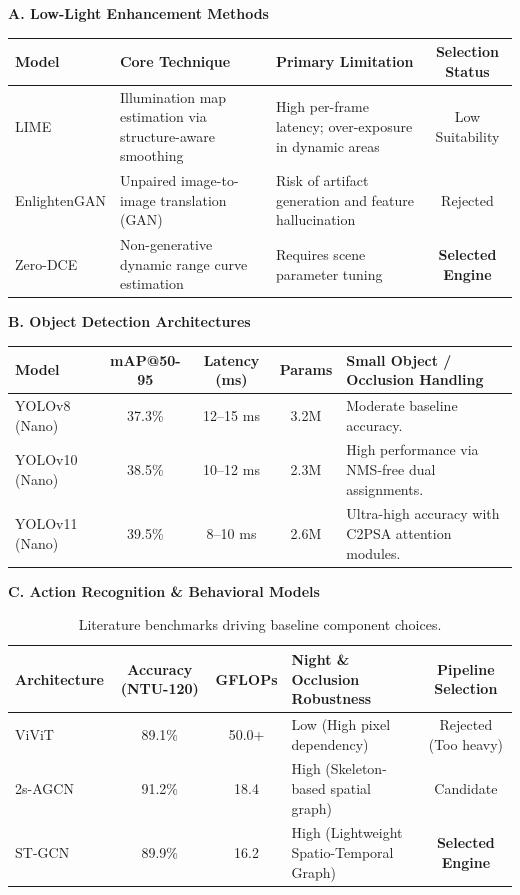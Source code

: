 \documentclass[11pt, a4paper]{article}
\begin{document}
\textbf{A. Low-Light Enhancement Methods}
\begin{table}[H]
\centering
\scriptsize
\renewcommand{\arraystretch}{1.2}
\begin{tabularx}{\textwidth}{|l|X|X|c|}
\hline
\textbf{Model} & \textbf{Core Technique} & \textbf{Primary Limitation} & \textbf{Selection Status} \\
\hline
LIME & Illumination map estimation via structure-aware smoothing & High per-frame latency; over-exposure in dynamic areas & Low Suitability \\
\hline
EnlightenGAN & Unpaired image-to-image translation (GAN) & Risk of artifact generation and feature hallucination & Rejected \\
\hline
Zero-DCE & Non-generative dynamic range curve estimation & Requires scene parameter tuning & \textbf{Selected Engine} \\
\hline
\end{tabularx}
\end{table}

\textbf{B. Object Detection Architectures}
\begin{table}[H]
\centering
\scriptsize
\renewcommand{\arraystretch}{1.2}
\begin{tabularx}{\textwidth}{|l|c|c|c|X|}
\hline
\textbf{Model} & \textbf{mAP@50-95} & \textbf{Latency (ms)} & \textbf{Params} & \textbf{Small Object / Occlusion Handling} \\
\hline
YOLOv8 (Nano) & 37.3\% & 12--15 ms & 3.2M & Moderate baseline accuracy. \\
\hline
YOLOv10 (Nano) & 38.5\% & 10--12 ms & 2.3M & High performance via NMS-free dual assignments. \\
\hline
YOLOv11 (Nano) & 39.5\% & 8--10 ms & 2.6M & Ultra-high accuracy with C2PSA attention modules. \\
\hline
\end{tabularx}
\end{table}

\textbf{C. Action Recognition \& Behavioral Models}
\begin{table}[H]
\centering
\scriptsize
\renewcommand{\arraystretch}{1.2}
\begin{tabularx}{\textwidth}{|X|c|c|X|c|}
\hline
\textbf{Architecture} & \textbf{Accuracy (NTU-120)} & \textbf{GFLOPs} & \textbf{Night \& Occlusion Robustness} & \textbf{Pipeline Selection} \\
\hline
ViViT & 89.1\% & 50.0+ & Low (High pixel dependency) & Rejected (Too heavy) \\
\hline
2s-AGCN & 91.2\% & 18.4 & High (Skeleton-based spatial graph) & Candidate \\
\hline
ST-GCN & 89.9\% & 16.2 & High (Lightweight Spatio-Temporal Graph) & \textbf{Selected Engine} \\
\hline
\end{tabularx}
\caption{Literature benchmarks driving baseline component choices.}
\end{table}
\end{document}
